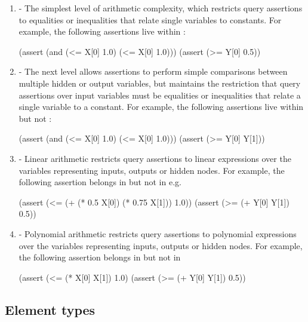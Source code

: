 \begin{enumerate}
\item \textbf{\bnd{}} - 
The simplest level of arithmetic complexity, which restricts query assertions to equalities or inequalities that relate single variables to constants. For example, the following assertions live within \bnd{}:

\begin{code}[style=lbnf]
(assert (and (<= X[0] 1.0) (<= X[0] 1.0)))
(assert (>= Y[0] 0.5))
\end{code}

\item \textbf{\cout{}} - 
The next level allows assertions to perform simple comparisons between multiple hidden or output variables, but maintains the restriction that query assertions over input variables must be equalities or inequalities that relate a single variable to a constant. For example, the following assertions live within \cout{} but not \bnd{}:

\begin{code}[style=lbnf]
(assert (and (<= X[0] 1.0) (<= X[0] 1.0)))
(assert (>= Y[0] Y[1]))
\end{code}

\item \textbf{\lin{}} - Linear arithmetic restricts query assertions to linear expressions over the variables representing inputs, outputs or hidden nodes. For example, the following assertion belongs in \lin{} but not in \cout{} e.g. 

\begin{code}[style=lbnf]
(assert (<= (+ (* 0.5 X[0]) (* 0.75 X[1])) 1.0))
(assert (>= (+ Y[0] Y[1]) 0.5))
\end{code}

\item \textbf{\poly{}} - Polynomial arithmetic restricts query assertions to polynomial expressions over the variables representing inputs, outputs or hidden nodes. 
For example, the following assertion belongs in \poly{} but not in \lin{}

\begin{code}[style=lbnf]
(assert (<= (* X[0] X[1]) 1.0)
(assert (>= (+ Y[0] Y[1]) 0.5))
\end{code}

\end{enumerate}


\subsection{Element types}
\label{sec:element-types}

